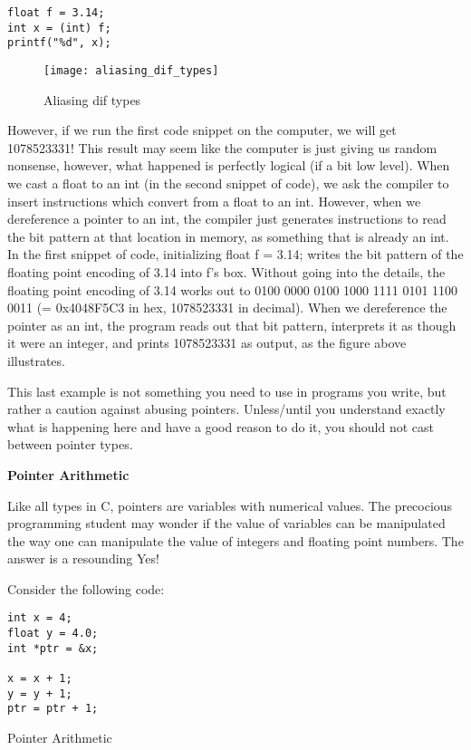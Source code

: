 \documentclass[11pt, a4paper]{article}
\begin{document}
\texttt{float f = 3.14;} \\
\texttt{int x = (int) f;} \\
\texttt{printf("\%d", x);} 


\begin{figure}[htpb]
  \centering
  \texttt{[image: aliasing\_dif\_types]}
  \caption{Aliasing dif types}
  \label{fig:aliasing_dif_types}
\end{figure}

However, if we run the first code snippet on the computer, we will get 1078523331! This result may seem like the computer is just giving us random nonsense, however, what happened is perfectly logical (if a bit low level). When we cast a float to an int (in the second snippet of code), we ask the compiler to insert instructions which convert from a float to an int. However, when we dereference a pointer to an int, the compiler just generates instructions to read the bit pattern at that location in memory, as something that is already an int. In the first snippet of code, initializing float f = 3.14; writes the bit pattern of the floating point encoding of 3.14 into f’s box. Without going into the details, the floating point encoding of 3.14 works out to 0100 0000 0100 1000 1111 0101 1100 0011 (= 0x4048F5C3 in hex, 1078523331 in decimal). When we dereference the pointer as an int, the program reads out that bit pattern, interprets it as though it were an integer, and prints 1078523331 as output, as the figure above illustrates.


This last example is not something you need to use in programs you write, but rather a caution against abusing pointers. Unless/until you understand exactly what is happening here and have a good reason to do it, you should not cast between pointer types.




\textbf{Pointer Arithmetic}

Like all types in C, pointers are variables with numerical values. The precocious programming student may wonder if the value of variables can be manipulated the way one can manipulate the value of integers and floating point numbers. The answer is a resounding Yes!

Consider the following code:

\begin{listing}
\begin{verbatim}
int x = 4;
float y = 4.0;
int *ptr = &x;

x = x + 1;
y = y + 1;
ptr = ptr + 1;
\end{verbatim}
\caption{Pointer Arithmetic}
\label{lst:pointer_arithmetic}
\end{listing}
\end{document}
